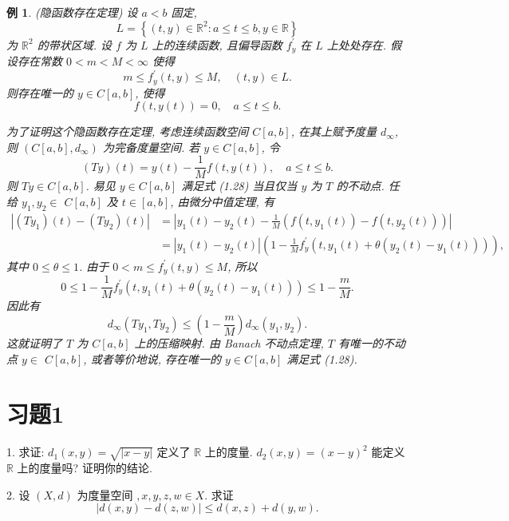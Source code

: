 \documentclass[openany]{ctexbook}
\theoremstyle{kaiti}
\theoremstyle{normal}
\newtheorem{example}{例}[section]
\begin{document}
\begin{example}
(隐函数存在定理) 设 $a<b$ 固定,
$$
L=\left\{(t, y) \in \mathbb{R}^2: a \leqslant t \leqslant b, y \in \mathbb{R}\right\}
$$
为 $\mathbb{R}^2$ 的带状区域. 设 $f$ 为 $L$ 上的连续函数, 且偏导函数 $f_{y}^{\prime}$ 在 $L$ 上处处存在. 假设存在常数 $0<m<M<\infty$ 使得
$$
m \leqslant f_{y}^{\prime}(t, y) \leqslant M, \quad(t, y) \in L.
$$
则存在唯一的 $y \in C[a, b]$, 使得
\begin{equation}
  f(t, y(t))=0, \quad a \leqslant t \leqslant b.
\end{equation}

为了证明这个隐函数存在定理, 考虑连续函数空间 $C[a, b]$, 在其上赋予度量 $d_{\infty}$, 则 $\left(C[a, b], d_{\infty}\right)$ 为完备度量空间. 若 $y \in C[a, b]$, 令
$$
(T y)(t)=y(t)-\frac{1}{M} f(t, y(t)), \quad a \leqslant t \leqslant b.
$$
则 $T y \in C[a, b]$. 易见 $y \in C[a, b]$ 满足式 (1.28) 当且仅当 $y$ 为 $T$ 的不动点. 任给 $y_1, y_2 \in$ $C[a, b]$ 及 $t \in[a, b]$, 由微分中值定理, 有
$$
\begin{aligned}
\left|\left(T y_1\right)(t)-\left(T y_2\right)(t)\right| &=\left|y_1(t)-y_2(t)-\frac{1}{M}\left(f\left(t, y_1(t)\right)-f\left(t, y_2(t)\right)\right)\right| \\
&=\left|y_1(t)-y_2(t)\right|\left(1-\frac{1}{M} f_{y}^{\prime}\left(t, y_1(t)+\theta\left(y_2(t)-y_1(t)\right)\right)\right),
\end{aligned}
$$
其中 $0 \leqslant \theta \leqslant 1$. 由于 $0<m \leqslant f_{y}^{\prime}(t, y) \leqslant M$, 所以
$$
0 \leqslant 1-\frac{1}{M} f_{y}^{\prime}\left(t, y_1(t)+\theta\left(y_2(t)-y_1(t)\right)\right) \leqslant 1-\frac{m}{M}.
$$
因此有
$$
d_{\infty}\left(T y_1, T y_2\right) \leqslant\left(1-\frac{m}{M}\right) d_{\infty}\left(y_1, y_2\right).
$$
这就证明了 $T$ 为 $C[a, b]$ 上的压缩映射. 由 Banach 不动点定理, $T$ 有唯一的不动点 $y \in$ $C[a, b]$, 或者等价地说, 存在唯一的 $y \in C[a, b]$ 满足式 (1.28).
\end{example}

\section*{习题1}

1. 求证: $d_1(x, y)=\sqrt{|x-y|}$ 定义了 $\mathbb{R}$ 上的度量. $d_2(x, y)=(x-y)^2$ 能定义 $\mathbb{R}$ 上的度量吗? 证明你的结论.

2. 设 $(X, d)$ 为度量空间 $, x, y, z, w \in X$. 求证
$$
|d(x, y)-d(z, w)| \leqslant d(x, z)+d(y, w).
$$
\end{document}
